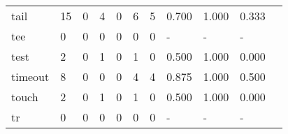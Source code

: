 \begin{longtable}{lp{1.2cm}p{1.2cm}p{1.2cm}p{1.2cm}p{1.2cm}p{1.2cm}p{1.2cm}p{1.2cm}p{1.2cm}p{1.2cm}}
tail      &                                    15 &                                                  0 &                                                4 &                                               0 &                                                6 &                                              5 &                                         0.700 &                                              1.000 &                                              0.333 \\
tee       &                                     0 &                                                  0 &                                                0 &                                               0 &                                                0 &                                              0 &                                             - &                                                  - &                                                  - \\
test      &                                     2 &                                                  0 &                                                1 &                                               0 &                                                1 &                                              0 &                                         0.500 &                                              1.000 &                                              0.000 \\
timeout   &                                     8 &                                                  0 &                                                0 &                                               0 &                                                4 &                                              4 &                                         0.875 &                                              1.000 &                                              0.500 \\
touch     &                                     2 &                                                  0 &                                                1 &                                               0 &                                                1 &                                              0 &                                         0.500 &                                              1.000 &                                              0.000 \\
tr        &                                     0 &                                                  0 &                                                0 &                                               0 &                                                0 &                                              0 &                                             - &                                                  - &                                                  - \\

\end{longtable}
